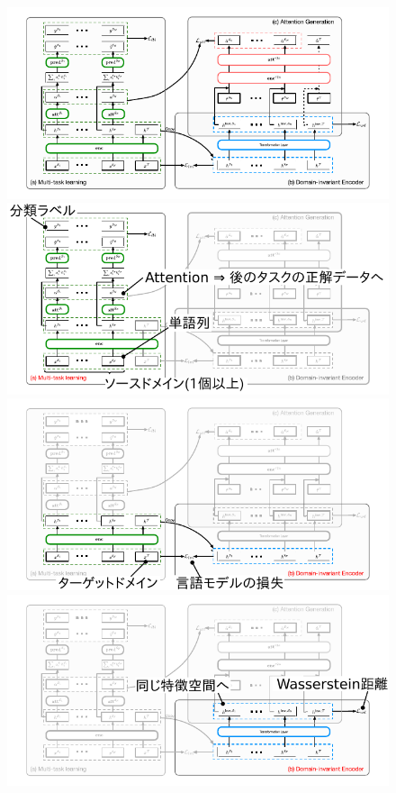 \begin{frame}
\begin{figure}
\centering
    \begin{overprint}
    \includegraphics{fig/proposed.pdf}%
    \includegraphics{fig/proposed_a.pdf}%
    \includegraphics{fig/proposed_b1.pdf}%
    \includegraphics{fig/proposed_b2.pdf}%

\end{overprint}
\end{figure}
\end{frame}
